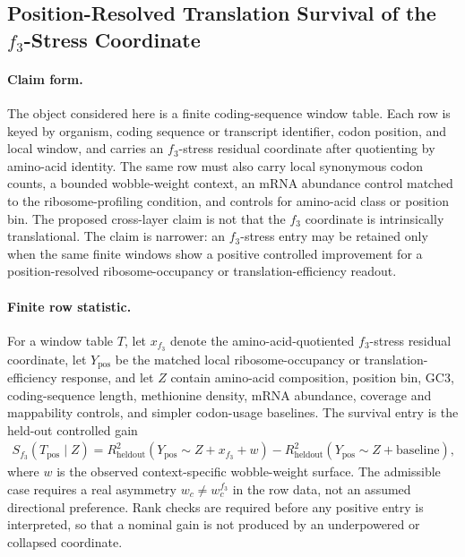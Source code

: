 \subsection{Position-Resolved Translation Survival of the $f_3$-Stress Coordinate}\label{sec:q6-f3-stress-position-resolved-translation-survival-cross-layer}

\paragraph{Claim form.}
The object considered here is a finite coding-sequence window table.  Each row is keyed by organism, coding sequence or transcript identifier, codon position, and local window, and carries an $f_3$-stress residual coordinate after quotienting by amino-acid identity.  The same row must also carry local synonymous codon counts, a bounded wobble-weight context, an mRNA abundance control matched to the ribosome-profiling condition, and controls for amino-acid class or position bin.  The proposed cross-layer claim is not that the $f_3$ coordinate is intrinsically translational.  The claim is narrower: an $f_3$-stress entry may be retained only when the same finite windows show a positive controlled improvement for a position-resolved ribosome-occupancy or translation-efficiency readout.

\paragraph{Finite row statistic.}
For a window table $T$, let $x_{f_3}$ denote the amino-acid-quotiented $f_3$-stress residual coordinate, let $Y_{\mathrm{pos}}$ be the matched local ribosome-occupancy or translation-efficiency response, and let $Z$ contain amino-acid composition, position bin, GC3, coding-sequence length, methionine density, mRNA abundance, coverage and mappability controls, and simpler codon-usage baselines.  The survival entry is the held-out controlled gain
$$
\begin{aligned}
S_{f_3}(T_{\mathrm{pos}}\mid Z)
  = R^2_{\mathrm{heldout}}(Y_{\mathrm{pos}}\sim Z+x_{f_3}+w)
    -R^2_{\mathrm{heldout}}(Y_{\mathrm{pos}}\sim Z+\mathrm{baseline}),
\end{aligned}
$$
where $w$ is the observed context-specific wobble-weight surface.  The admissible case requires a real asymmetry $w_c\neq w_c^{f_3}$ in the row data, not an assumed directional preference.  Rank checks are required before any positive entry is interpreted, so that a nominal gain is not produced by an underpowered or collapsed coordinate.

